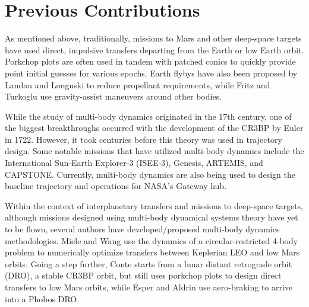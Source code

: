 \section{Previous Contributions}
As mentioned above, traditionally, missions to Mars and other deep-space targets have used direct,
impulsive transfers departing from the Earth or low Earth orbit. Porkchop plots are often used in
tandem with patched conics to quickly provide point initial guesses for various
epochs\cite{Drake:2009}. Earth flybys have also been proposed by Landau and Longuski to reduce
propellant requirements\cite{Landau:2006}, while Fritz and Turkoglu use gravity-assist maneuvers
around other bodies\cite{Fritz:2016}.

While the study of multi-body dynamics originated in the 17th century, one of the biggest
breakthroughs occurred with the development of the CR3BP by Euler in 1722\cite{BarrowGreen:1997}.
However, it took centuries before this theory was used in trajectory design. Some notable missions
that have utilized multi-body dynamics include the International Sun-Earth Explorer-3
(ISEE-3)\cite{Farquhar:1984}, Genesis\cite{Lo:2001}, ARTEMIS\cite{Woodard:2009}, and
CAPSTONE\cite{Cheetham:2021}. Currently, multi-body dynamics are also being used to design the
baseline trajectory and operations for NASA's Gateway
hub\cite{Zamora:2024,Boudad:2022,ZimovanSpreen:2022}.

Within the context of interplanetary transfers and missions to deep-space targets, although
missions designed using multi-body dynamical systems theory have yet to be flown, several authors
have developed/proposed multi-body dynamics methodologies. Miele and Wang use the dynamics of a
circular-restricted 4-body problem to numerically optimize transfers between Keplerian LEO and low
Mars orbits\cite{Miele:1999}. Going a step further, Conte starts from a lunar distant retrograde
orbit (DRO), a stable CR3BP orbit, but still uses porkchop plots to design direct transfers to low
Mars orbits\cite{Conte:2017}, while Esper and Aldrin use aero-braking to arrive into a Phobos
DRO\cite{Esper:2019}.

